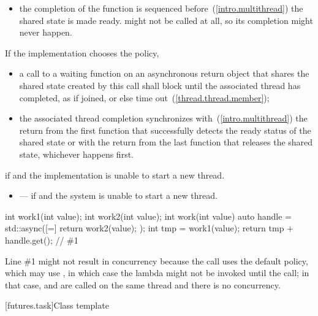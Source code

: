 \begin{itemdescr}
\begin{itemize}
\item
the completion of the function  is sequenced before~(\ref{intro.multithread}) the
shared state is made ready. \enternote {} might not be called at all,
so its completion might never happen. \exitnote
\end{itemize}

If the implementation chooses the  policy,

\begin{itemize}
\item
a call to a waiting function on an asynchronous return
object that shares the shared state created by this  call shall
block until the associated thread has completed, as if joined, or else time
out~(\ref{thread.thread.member});

\item
the associated thread completion
synchronizes with~(\ref{intro.multithread})
the return from
the first function
that successfully detects the ready status of the shared state or 
with the return from the last
function that releases the shared state, whichever
happens first.
\end{itemize}


\pnum
\throws {} if  and the
implementation is unable to start a new thread.

\pnum
\errors
\begin{itemize}
\item {} --- if
 and the system is unable to start a new thread.
\end{itemize}
\end{itemdescr}

\pnum
\enterexample
\begin{codeblock}
int work1(int value);
int work2(int value);
int work(int value) {
  auto handle = std::async([=]{ return work2(value); });
  int tmp = work1(value);
  return tmp + handle.get();    // \#1
}
\end{codeblock}

\enternote Line \#1 might not result in concurrency because
the  call uses the default policy, which may use
, in which case the lambda might not be invoked until the
 call; in that case,  and  are called on the
same thread and there is no concurrency.
\exitnote
\exitexample

[futures.task]{Class template }

